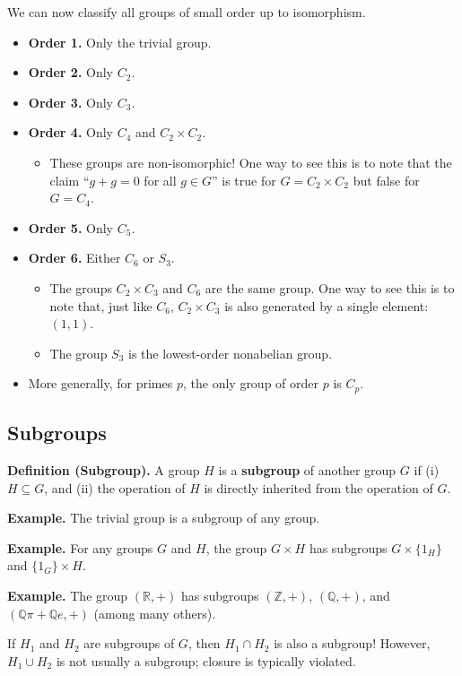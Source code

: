 We can now classify all groups of small order up to isomorphism.
\begin{itemize}
    \item \textbf{Order 1.} Only the trivial group.
    \item \textbf{Order 2.} Only $C_2$.
    \item \textbf{Order 3.} Only $C_3$.
    \item \textbf{Order 4.} Only $C_4$ and $C_2 \times C_2$.
    \begin{itemize}
        \item These groups are non-isomorphic!  One way to see this is to note that the claim ``$g + g = 0$ for all $g \in G$'' is true for $G = C_2 \times C_2$ but false for $G = C_4$.
    \end{itemize}
    \item \textbf{Order 5.} Only $C_5$.
    \item \textbf{Order 6.} Either $C_6$ or $S_3$.
    \begin{itemize}
        \item The groups $C_2 \times C_3$ and $C_6$ are the same group.  One way to see this is to note that, just like $C_6$, $C_2 \times C_3$ is also generated by a single element: $(1, 1)$.
        \item The group $S_3$ is the lowest-order nonabelian group.
    \end{itemize}
    \item More generally, for primes $p$, the only group of order $p$ is $C_p$.
\end{itemize}

\subsection{Subgroups}

\textbf{Definition (Subgroup).} A group $H$ is a \textbf{subgroup} of another group $G$ if (i) $H \subseteq G$, and (ii) the operation of $H$ is directly inherited from the operation of $G$.

\textbf{Example.} The trivial group is a subgroup of any group.

\textbf{Example.} For any groups $G$ and $H$, the group $G \times H$ has subgroups $G \times \{1_H\}$ and $\{1_G\} \times H$.

\textbf{Example.} The group $(\mathbb{R}, +)$ has subgroups $(\mathbb{Z}, +)$, $(\mathbb{Q}, +)$, and $(\mathbb{Q}\pi + \mathbb{Q}e, +)$ (among many others).

\begin{remark}
    If $H_1$ and $H_2$ are subgroups of $G$, then $H_1 \cap H_2$ is also a subgroup!  However, $H_1 \cup H_2$ is not usually a subgroup; closure is typically violated.
\end{remark}

